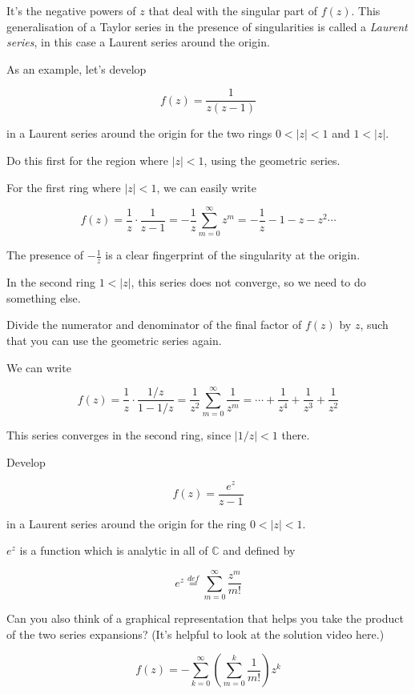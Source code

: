 It's the negative powers of $z$ that deal with the singular part of $f(z)$. This generalisation of a Taylor series in the presence of singularities is called a \emph{Laurent series}, in this case a Laurent series around the origin.


As an example, let's develop

$$f(z)=\frac{1}{z(z-1)}$$

in a Laurent series around the origin for the two rings $0 < | z | < 1$ and $ 1 < |z|$.

\begin{cue}
Do this first for the region where  $| z | < 1$, using the geometric series.
\end{cue}

For the first ring where $| z | < 1$, we can easily write

$$f(z)=\frac{1}{z} \cdot \frac{1}{z-1} = -\frac{1}{z} \sum_{m=0}^{\infty} z^m =-\frac{1}{z}-1-z-z^2 \cdots$$

The presence of $-\frac{1}{z}$ is a clear fingerprint of the singularity at the origin.

In the second ring  $ 1 < |z|$, this series does not converge, so we need to do something else.

\begin{cue}
Divide the numerator and denominator of the final factor of $f(z)$ by $z$, such that you can use the geometric series again.
\end{cue}

We can write

$$f(z)=\frac{1}{z} \cdot \frac{1 / z }{1-1/z} = \frac{1}{z^2} \sum_{m=0}^{\infty} \frac{1}{z^m} =\cdots+\frac{1}{z^4}+\frac{1}{z^3} + \frac{1}{z^2}$$

This series converges in the second ring, since $|1/z| < 1$ there.

\pagebreak

\begin{exer}
\label{ex_laurent_1}
Develop

$$f(z)=\frac{e^z}{z-1}$$

in a Laurent series around the origin for the ring $0 < | z | < 1$.

$e^z$ is a function which is analytic in all of $\mathbb{C}$ and defined by

$$e^z \stackrel{def}{=} \sum_{m=0}^{\infty} \frac{z^m}{m!} $$

Can you also think of a graphical representation that helps you take the product of the two series expansions? (It's helpful to look at the solution video here.)

\begin{sol}
$$f(z)= - \sum_{k=0}^{\infty} \left(\sum _{m=0}^k \frac{1}{m!} \right) z^k $$
\end{sol}

\end{exer}

